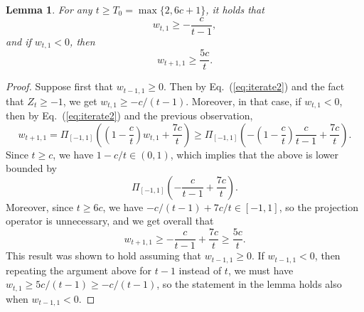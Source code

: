 \documentclass{article}
\newtheorem{lemma}{Lemma}
\renewcommand{\eqref}[1]{Eq.~(\ref{#1})}
\begin{document}
\begin{lemma}\label{lem:above0}
For any $t\geq T_0=\max\{2,6c+1\}$, it holds that
\[
w_{t,1}\geq -\frac{c}{t-1},
\]
and if $w_{t,1}<0$, then
\[
w_{t+1,1}\geq \frac{5c}{t}.
\]
\end{lemma}

\begin{proof}
Suppose first that $w_{t-1,1}\geq 0$. Then by \eqref{eq:iterate2} and the fact that $Z_t\geq -1$, we get $w_{t,1}\geq -c/(t-1)$. Moreover, in that case,  if $w_{t,1}<0$, then by \eqref{eq:iterate2} and the previous observation,
\[
w_{t+1,1} = \Pi_{[-1,1]}\left(\left(1-\frac{c}{t}\right)w_{t,1}+\frac{7c}{t}\right) \geq \Pi_{[-1,1]}\left(-\left(1-\frac{c}{t}\right)\frac{c}{t-1}+\frac{7c}{t}\right).
\]
Since $t\geq c$, we have $1-c/t \in (0,1)$, which implies that the above is lower bounded by
\[
\Pi_{[-1,1]}\left(-\frac{c}{t-1}+\frac{7c}{t}\right).
\]
Moreover, since $t\geq 6c$, we have $-c/(t-1)+7c/t \in [-1,1]$, so the projection operator is unnecessary, and we get overall that
\[
w_{t+1,1} \geq -\frac{c}{t-1}+\frac{7c}{t} \geq \frac{5c}{t}.
\]
This result was shown to hold assuming that $w_{t-1,1}\geq 0$. If $w_{t-1,1}<0$, then repeating the argument above for $t-1$ instead of $t$, we must have $w_{t,1}\geq 5c/(t-1) \geq -c/(t-1)$, so the statement in the lemma holds also when $w_{t-1,1}<0$.
\end{proof}
\end{document}
